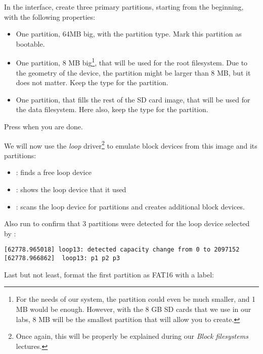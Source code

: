 In the  interface, create three primary partitions,
starting from the beginning, with the following properties:

\begin{itemize}
\item One partition, 64MB big, with the  partition type.
      Mark this partition as bootable.

\item One partition, 8 MB big\footnote{For the needs of our system,
  the partition could even be much smaller, and 1 MB would be enough.
  However, with the 8 GB SD cards that we use in our labs, 8 MB will
  be the smallest partition that  will allow you to
  create.}, that will be used for the root filesystem. Due to the
  geometry of the device, the partition might be larger than 8 MB,
  but it does not matter. Keep the  type for the
  partition.

\item One partition, that fills the rest of the SD card image, that will be
  used for the data filesystem. Here also, keep the  type
  for the partition.
\end{itemize}

Press  when you are done.

We will now use the {\em loop} driver\footnote{Once again, this will
be properly be explained during our {\em Block filesystems} lectures.}
to emulate block devices from this image and its partitions:


\begin{itemize}
\item {}: finds a free loop device
\item {}: shows the loop device that it used
\item {}: scans the loop device for partitions
    and creates additional  block devices.
\end{itemize}

Also run  to confirm that 3 partitions were
detected for the loop device selected by :

\begin{verbatim}
[62778.965018] loop13: detected capacity change from 0 to 2097152
[62778.966862]  loop13: p1 p2 p3
\end{verbatim}

Last but not least, format the first partition as FAT16 with
a  label:


